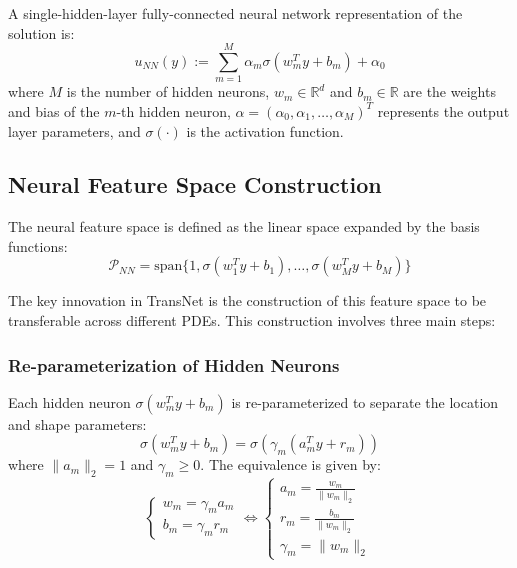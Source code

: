 \documentclass[11pt]{article}
\begin{document}
A single-hidden-layer fully-connected neural network representation of the solution is:
\begin{equation}
u_{NN}(y) := \sum_{m=1}^{M} \alpha_m \sigma(w_m^T y + b_m) + \alpha_0
\end{equation}
where $M$ is the number of hidden neurons, $w_m \in \mathbb{R}^d$ and $b_m \in \mathbb{R}$ are the weights and bias of the $m$-th hidden neuron, $\alpha = (\alpha_0, \alpha_1, \ldots, \alpha_M)^T$ represents the output layer parameters, and $\sigma(\cdot)$ is the activation function.

\subsection{Neural Feature Space Construction}

The neural feature space is defined as the linear space expanded by the basis functions:
\begin{equation}
\mathcal{P}_{NN} = \text{span}\{1, \sigma(w_1^T y + b_1), \ldots, \sigma(w_M^T y + b_M)\}
\end{equation}

The key innovation in TransNet is the construction of this feature space to be transferable across different PDEs. This construction involves three main steps:

\subsubsection{Re-parameterization of Hidden Neurons}

Each hidden neuron $\sigma(w_m^T y + b_m)$ is re-parameterized to separate the location and shape parameters:
\begin{equation}
\sigma(w_m^T y + b_m) = \sigma(\gamma_m(a_m^T y + r_m))
\end{equation}
where $\|a_m\|_2 = 1$ and $\gamma_m \geq 0$. The equivalence is given by:
\begin{equation}
\begin{cases}
w_m = \gamma_m a_m \\
b_m = \gamma_m r_m
\end{cases}
\Leftrightarrow
\begin{cases}
a_m = \frac{w_m}{\|w_m\|_2} \\
r_m = \frac{b_m}{\|w_m\|_2} \\
\gamma_m = \|w_m\|_2
\end{cases}
\end{equation}
\end{document}
